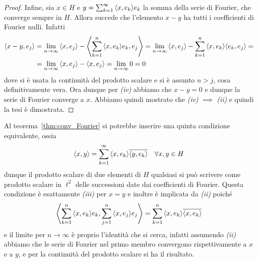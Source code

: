 \begin{proof}
    Infine, sia \(x \in H\) e \(y = \sum_{k=1}^{\infty} {\left\langle x, e_{k}\right\rangle} e_{k} \)
    la somma della serie di Fourier, che converge sempre in \(H\). Allora
    succede che l'elemento \(x - y\) ha tutti i coefficienti di Fourier nulli.
    Infatti 
    \begin{align*}
        {\left\langle x - y, e_{j}\right\rangle} &= \lim_{n \to \infty} {\left\langle x, e_{j}\right\rangle} -
      {\left\langle\sum_{k=1}^{n} {\left\langle x, e_{k}\right\rangle} e_{k}, e_{j} \right\rangle} = \lim_{n \to \infty}
      {\left\langle x, e_{j}\right\rangle} - \sum_{k=1}^{n} {\left\langle x, e_{k}\right\rangle} {\left\langle e_{k}, e_{j}\right\rangle} = \\
                            &= \lim_{n \to \infty} {\left\langle x, e_{j}\right\rangle} - {\left\langle x,
                            e_{j}\right\rangle} = \lim_{n \to \infty} 0 = 0
    \end{align*}
    dove si è usata la continuità del prodotto scalare e si è assunto \(n > j\),
    cosa definitivamente vera. Ora dunque per \textit{(iv)} abbiamo che \(x - y
    = 0\) e dunque la serie di Fourier converge a \(x\). Abbiamo quindi mostrato
    che \textit{(iv)} \(\implies\) \textit{(ii)} e quindi la tesi è dimostrata.
\end{proof}
\begin{remark}
    Al teorema~\ref{thm:conv_Fourier} si potrebbe inserire una
    quinta condizione equivalente, ossia
    \[
        {\left\langle x, y\right\rangle} = \sum_{k=1}^{\infty} {\left\langle x, e_{k}\right\rangle} \overline{{\left\langle y,
        e_{k}\right\rangle}}  \quad \forall x, y \in H
    \]
    dunque il prodotto scalare di due elementi di \(H\) qualsiasi si può
    scrivere come prodotto scalare in \(\ell^2\) delle successioni date dai
    coefficienti di Fourier. Questa condizione è esattamente
    \textit{(iii)} per \(x = y\) e inoltre è implicata da \textit{(ii)} poiché
    \[
      {\left\langle\sum_{k=1}^{n} {\left\langle x, e_{k}\right\rangle} e_{k} , \sum_{j=1}^{n} {\left\langle x,
              e_{j}\right\rangle} e_{j} \right\rangle} = \sum_{k=1}^{n} {\left\langle x, e_{k}\right\rangle} \overline{{\left\langle x,
      e_{k}\right\rangle}}
    \]
    e il limite per \(n \to \infty\) è proprio l'identità che si cerca, infatti
    assumendo \textit{(ii)} abbiamo che le serie di Fourier nel primo membro
    convergono rispettivamente a \(x\) e a \(y\), e per la continuità del
    prodotto scalare si ha il risultato.
\end{remark}

